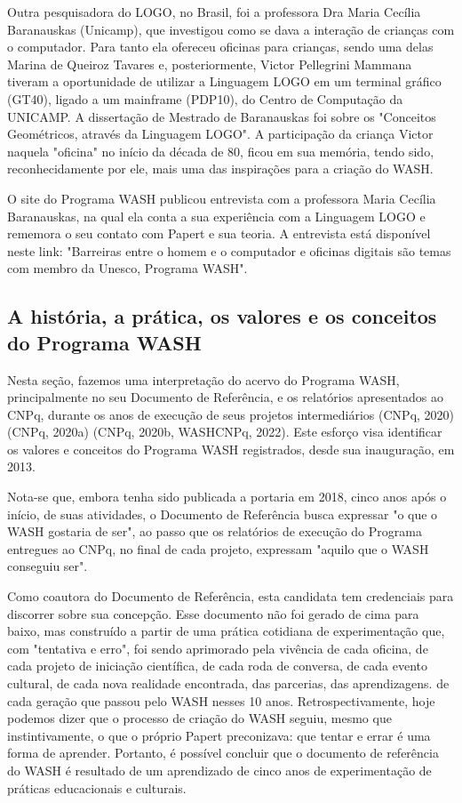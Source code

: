 Outra pesquisadora do LOGO, no Brasil, foi a professora  Dra Maria Cecília Baranauskas (Unicamp), que investigou como  se dava a interação de crianças com o computador. Para tanto ela ofereceu oficinas para  crianças, sendo uma delas Marina de Queiroz Tavares  e, posteriormente, Victor Pellegrini Mammana  tiveram a oportunidade  de  utilizar a Linguagem LOGO em um terminal gráfico (GT40), ligado a um mainframe (PDP10), do Centro de Computação da UNICAMP. A dissertação de Mestrado de Baranauskas foi sobre os "Conceitos Geométricos, através da Linguagem LOGO". A participação da criança Victor naquela "oficina" no início da década de 80, ficou em sua memória, tendo sido, reconhecidamente por ele, mais uma das inspirações para a criação do WASH.

O site do Programa WASH publicou entrevista com a professora Maria Cecília Baranauskas, na qual ela conta a sua experiência com a Linguagem LOGO e rememora o seu contato com Papert e sua teoria. A entrevista está disponível neste link: "Barreiras entre o homem e o computador e oficinas digitais são temas com membro da Unesco, Programa WASH".

\subsection[A história, a prática, os valores e os conceitos do Programa WASH]{A história, a prática, os valores e os conceitos do Programa WASH}\label{A história, a prática, os valores e os conceitos do Programa WASH}
Nesta seção, fazemos uma interpretação do acervo do Programa WASH, principalmente no seu Documento de Referência, e os relatórios apresentados ao CNPq, durante os anos de execução de seus projetos intermediários (CNPq, 2020)  (CNPq, 2020a) (CNPq, 2020b, WASHCNPq, 2022). Este esforço visa identificar os valores e conceitos do Programa WASH registrados, desde sua inauguração, em 2013.

Nota-se que, embora tenha sido publicada a portaria em 2018, cinco anos após o início, de suas atividades, o Documento de Referência busca expressar "o que o WASH gostaria de ser", ao passo que os relatórios de execução do Programa entregues ao CNPq, no final de cada projeto, expressam "aquilo que o WASH conseguiu ser".

Como coautora do Documento de Referência, esta candidata tem credenciais para discorrer sobre sua concepção. Esse documento não foi gerado de cima para baixo, mas construído a partir de uma prática cotidiana de experimentação que, com  "tentativa e erro", foi sendo aprimorado pela vivência de cada oficina, de cada projeto de iniciação científica, de cada roda de conversa, de cada  evento cultural, de cada nova realidade encontrada, das parcerias, das aprendizagens. de cada geração que passou pelo WASH nesses 10 anos. Retrospectivamente, hoje podemos dizer que o processo de criação do WASH seguiu, mesmo que instintivamente, o que o próprio Papert preconizava: que tentar e errar é uma forma de aprender. Portanto, é possível concluir que o documento de referência do WASH é resultado de um aprendizado de cinco anos de experimentação de práticas educacionais e culturais.

